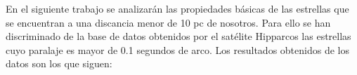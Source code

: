 \hspace*{12pt}En el siguiente trabajo se analizar\'{a}n las propiedades b\'{a}sicas de las estrellas que se encuentran a una discancia menor de 10 pc de nosotros. Para ello se han discriminado de la base de datos obtenidos por el satélite Hipparcos las estrellas cuyo paralaje es mayor de 0.1 segundos de arco. Los resultados obtenidos de los datos son los que siguen: